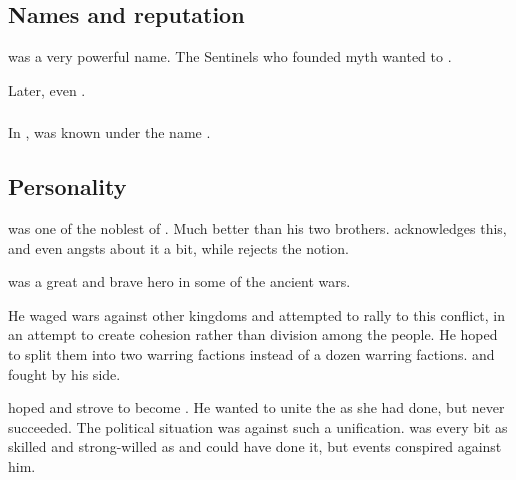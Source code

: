 \subsection{Names and reputation}
\quo{\Nexagglachel} was a very powerful name. 
The Sentinels who founded \Ortaican myth wanted to . 

Later, \Secherdamon even .




\subsubsection{\Mezzagrael}
In , \Nexagglachel was known under the name . 









\subsection{Personality}
\Nexagglachel{} was one of the noblest of \dragons. Much better than his two brothers. \Ishnaruchaefir{} acknowledges this, and even angsts about it a bit, while \Secherdamon{} rejects the notion. 

\Nexagglachel{} was a great and brave hero in some of the ancient wars. 

He waged wars against other \draconian{} kingdoms and attempted to rally \dragons{} to this conflict, in an attempt to create cohesion rather than division among the \draconian{} people. He hoped to split them into two warring factions instead of a dozen warring factions. \Ishnaruchaefir{} and \Secherdamon{} fought by his side. 

\Nexagglachel{} hoped and strove to become . 
He wanted to unite the \dzraicchenosses{} as she had done, but never succeeded. 
The political situation was against such a unification. 
\Nexagglachel{} was every bit as skilled and strong-willed as \Kserasshana{} and could have done it, but events conspired against him. 









